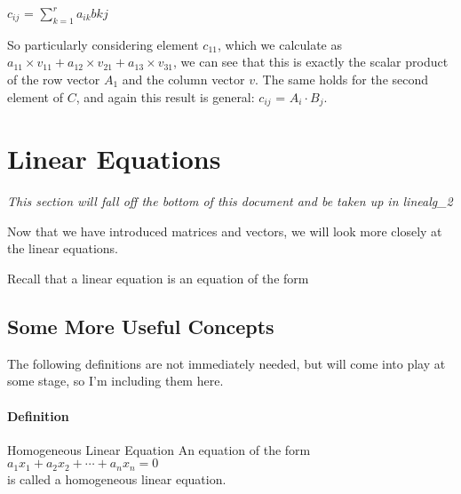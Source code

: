 \documentclass[12pt,letterpaper,final]{article}
\begin{document}
$c_{ij}$ = $\sum_{k=1}^{r} a_{ik}b{kj}$

So particularly considering element $c_{11}$, which we calculate as $a_{11} \times v_{11} + a_{12} \times v_{21} + a_{13} \times v_31$, we can see that this is exactly the scalar product of the row vector $A_1$ and the column vector $v$. The same holds for the second element of $C$, and again this result is general: 
$c_{ij}$ = $A_i \cdot B_j$. 

\section{Linear Equations}

\emph{This section will fall off the bottom of this document and be taken up in linealg\_2}

Now that we have introduced matrices and vectors, we will look more closely at the linear equations. 

Recall that a linear equation is an equation of the form 


\subsection{Some More Useful Concepts}
The following definitions are not immediately needed, but will come into play at some stage, so I'm including them here. 
\paragraph{Definition} Homogeneous Linear Equation
An equation of the form \\
$a_1x_1 + a_2x_2 + \cdots + a_nx_n = 0$\\
is called a homogeneous linear equation. 
\end{document}
